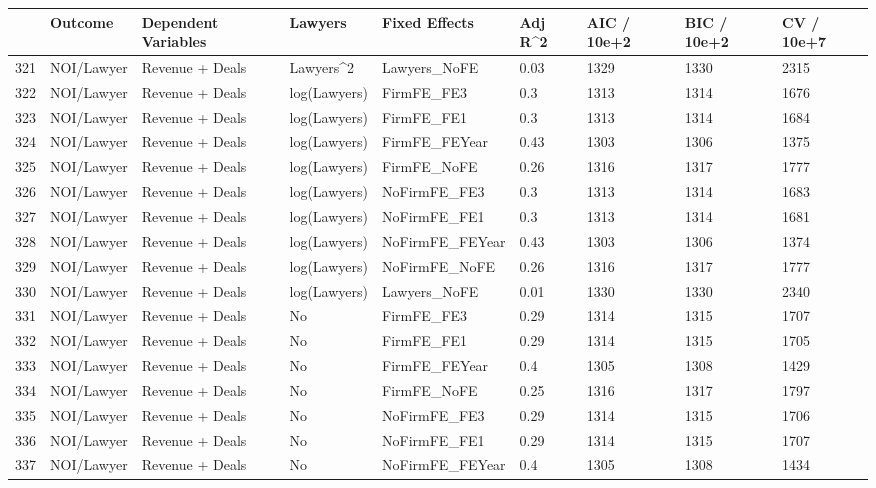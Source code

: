 \begin{table}[ht]
\centering
\begin{tabular}{rllllllll}
  \hline
 & Outcome & Dependent Variables & Lawyers & Fixed Effects & Adj R^2 & AIC / 10e+2 & BIC / 10e+2 & CV / 10e+7 \\ 
  \hline
321 & NOI/Lawyer & Revenue + Deals & Lawyers^2 & Lawyers\_NoFE & 0.03 & 1329 & 1330 & 2315 \\ 
  322 & NOI/Lawyer & Revenue + Deals & log(Lawyers) & FirmFE\_FE3 & 0.3 & 1313 & 1314 & 1676 \\ 
  323 & NOI/Lawyer & Revenue + Deals & log(Lawyers) & FirmFE\_FE1 & 0.3 & 1313 & 1314 & 1684 \\ 
  324 & NOI/Lawyer & Revenue + Deals & log(Lawyers) & FirmFE\_FEYear & 0.43 & 1303 & 1306 & 1375 \\ 
  325 & NOI/Lawyer & Revenue + Deals & log(Lawyers) & FirmFE\_NoFE & 0.26 & 1316 & 1317 & 1777 \\ 
  326 & NOI/Lawyer & Revenue + Deals & log(Lawyers) & NoFirmFE\_FE3 & 0.3 & 1313 & 1314 & 1683 \\ 
  327 & NOI/Lawyer & Revenue + Deals & log(Lawyers) & NoFirmFE\_FE1 & 0.3 & 1313 & 1314 & 1681 \\ 
  328 & NOI/Lawyer & Revenue + Deals & log(Lawyers) & NoFirmFE\_FEYear & 0.43 & 1303 & 1306 & 1374 \\ 
  329 & NOI/Lawyer & Revenue + Deals & log(Lawyers) & NoFirmFE\_NoFE & 0.26 & 1316 & 1317 & 1777 \\ 
  330 & NOI/Lawyer & Revenue + Deals & log(Lawyers) & Lawyers\_NoFE & 0.01 & 1330 & 1330 & 2340 \\ 
  331 & NOI/Lawyer & Revenue + Deals & No & FirmFE\_FE3 & 0.29 & 1314 & 1315 & 1707 \\ 
  332 & NOI/Lawyer & Revenue + Deals & No & FirmFE\_FE1 & 0.29 & 1314 & 1315 & 1705 \\ 
  333 & NOI/Lawyer & Revenue + Deals & No & FirmFE\_FEYear & 0.4 & 1305 & 1308 & 1429 \\ 
  334 & NOI/Lawyer & Revenue + Deals & No & FirmFE\_NoFE & 0.25 & 1316 & 1317 & 1797 \\ 
  335 & NOI/Lawyer & Revenue + Deals & No & NoFirmFE\_FE3 & 0.29 & 1314 & 1315 & 1706 \\ 
  336 & NOI/Lawyer & Revenue + Deals & No & NoFirmFE\_FE1 & 0.29 & 1314 & 1315 & 1707 \\ 
  337 & NOI/Lawyer & Revenue + Deals & No & NoFirmFE\_FEYear & 0.4 & 1305 & 1308 & 1434 \\ 

\end{tabular}
\end{table}
